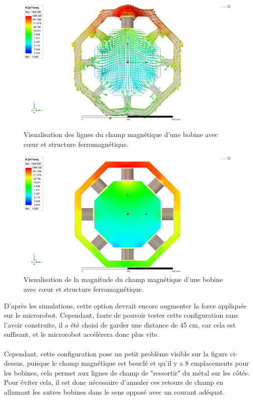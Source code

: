 \documentclass{article}
\begin{document}
\begin{figure}[H]
    \centering
    \begin{minipage}{0.45\textwidth}
        \centering
        \includegraphics[width=\linewidth]{Images/B1-5,0.png}
        \caption{Visualisation des lignes du champ magnétique d'une bobine avec cœur et structure ferromagnétique.}
    \end{minipage}\hfill
    \begin{minipage}{0.45\textwidth}
        \centering
        \includegraphics[width=\linewidth]{Images/B1-5,0_Magnitude.png}
        \caption{Visualisation de la magnitude du champ magnétique d'une bobine avec cœur et structure ferromagnétique.}
    \end{minipage}\hfill

\end{figure}
\noindent
D'après les simulations, cette option devrait encore augmenter la force appliquée sur le microrobot. Cependant, faute de pouvoir tester cette configuration sans l'avoir construite, il a été choisi de garder une distance de 45 cm, car cela est suffisant, et le microrobot accélérera donc plus vite.\\\\Cependant, cette configuration pose un petit problème visible sur la figure ci-dessus, puisque le champ magnétique est bouclé et qu'il y a 8 emplacements pour les bobines, cela permet aux lignes de champ de "ressortir" du métal sur les côtés. Pour éviter cela, il est donc nécessaire d'annuler ces retours de champ en allumant les autres bobines dans le sens opposé avec un courant adéquat.
\end{document}

